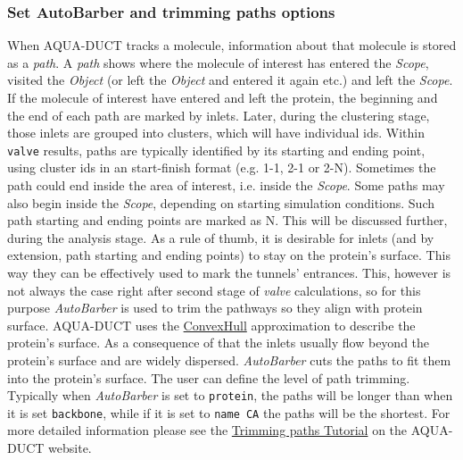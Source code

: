 \documentclass[9pt,tutorial]{livecoms}
\begin{document}
\subsubsection{Set AutoBarber and trimming paths options}
When AQUA-DUCT tracks a molecule, information about that molecule is stored as a \emph{path}. A \emph{path} shows where the molecule of interest has entered the \emph{Scope}, visited the \emph{Object} (or left the \emph{Object} and entered it again etc.) and left the \emph{Scope}. If the molecule of interest have entered and left the protein, the beginning and the end of each path are marked by inlets. Later, during the clustering stage, those inlets are grouped into clusters, which will have individual ids. Within \texttt{valve} results, paths are typically identified by its starting and ending point, using cluster ids in an start-finish format (e.g. 1-1, 2-1 or 2-N). Sometimes the path could end inside the area of interest, i.e. inside the \emph{Scope}. Some paths may also begin inside the \emph{Scope}, depending on starting simulation conditions. Such path starting and ending points are marked as N. This will be discussed further, during the analysis stage. As a rule of thumb, it is desirable for inlets (and by extension, path starting and ending points) to stay on the protein’s surface. This way they can be effectively used to mark the tunnels’ entrances. This, however is not always the case right after second stage of \emph{valve} calculations, so for this purpose \emph{AutoBarber} is used to trim the pathways so they align with protein surface. AQUA-DUCT uses the \href{https://tunneling-group.github.io/aqua-duct/valve/valve_manual.html?highlight=paths#convex-hulls-of-macromolecule-atoms}{ConvexHull} approximation to describe the protein’s surface. As a consequence of that the inlets usually flow beyond the protein’s surface and are widely dispersed. \emph{AutoBarber} cuts the paths to fit them into the protein’s surface. The user can define the level of path trimming. Typically when \textit{AutoBarber} is set to \texttt{protein}, the paths will be longer than when it is set \texttt{backbone}, while if it is set to \texttt{name CA} the paths will be the shortest. For more detailed information please see the \href{http://www.aquaduct.pl/trimming-paths/}{Trimming paths Tutorial} on the AQUA-DUCT website.
\end{document}

